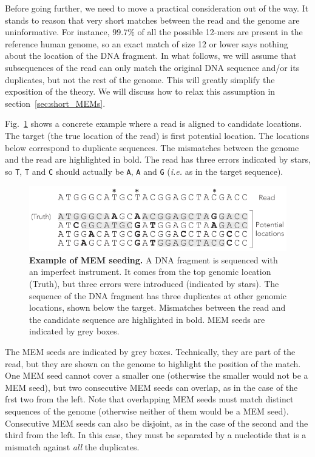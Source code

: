 \documentclass{article}
\begin{document}
Before going further, we need to move a practical consideration out of the
way. It stands to reason that very short matches between the read and the
genome are uninformative. For instance, $99.7\%$ of all the possible
12-mers are present in the reference human genome, so an exact match of
size 12 or lower says nothing about the location of the DNA fragment. In
what follows, we will assume that subsequences of the read can only match
the original DNA sequence and/or its duplicates, but not the rest of the
genome. This will greatly simplify the exposition of the theory. We will
discuss how to relax this assumption in section~\ref{sec:short_MEMs}.

Fig.~\ref{fig:MEM_example} shows a concrete example where a read is
aligned to candidate locations. The target (the true location of the
read) is first potential location. The locations below correspond to
duplicate sequences. The mismatches between the genome and the read are
highlighted in bold. The read has three errors indicated by stars, so
\texttt{T}, \texttt{T} and \texttt{C} should actually be \texttt{A},
\texttt{A} and \texttt{G} (\textit{i.e.} as in the target sequence).

\begin{figure}[h]
\centering
\includegraphics[scale=1]{MEM_example.pdf}
\caption{\textbf{Example of MEM seeding.}
A DNA fragment is sequenced with an imperfect instrument. It comes from
the top genomic location (Truth), but three errors were introduced
(indicated by stars). The sequence of the DNA fragment has three
duplicates at other genomic locations, shown below the target. Mismatches
between the read and the candidate sequence are highlighted in bold. MEM
seeds are indicated by grey boxes.}
\label{fig:MEM_example}
\end{figure}

The MEM seeds are indicated by grey boxes. Technically, they are part of
the read, but they are shown on the genome to highlight the position of
the match. One MEM seed cannot cover a smaller one (otherwise the smaller
would not be a MEM seed), but two consecutive MEM seeds can overlap, as in
the case of the frst two from the left. Note that overlapping MEM seeds
must match distinct sequences of the genome (otherwise neither of them
would be a MEM seed). Consecutive MEM seeds can also be disjoint, as in
the case of the second and the third from the left. In this case, they
must be separated by a nucleotide that is a mismatch against \emph{all}
the duplicates.
\end{document}
